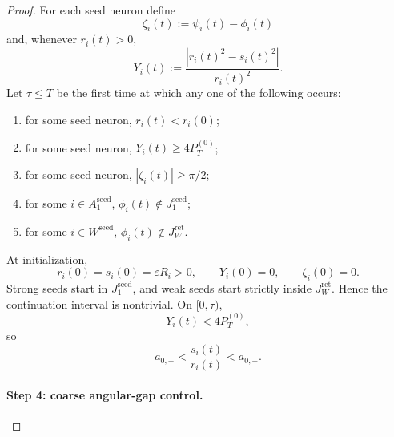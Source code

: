 \documentclass{article} %
\theoremstyle{plain}
\theoremstyle{definition}
\theoremstyle{remark}
\begin{document}
\begin{proof}
For each seed neuron define
\[
\zeta_i(t):=\psi_i(t)-\phi_i(t)
\]
and, whenever $r_i(t)>0$,
\[
Y_i(t)
:=
\frac{|r_i(t)^2-s_i(t)^2|}{r_i(t)^2}.
\]
Let $\tau\le T$ be the first time at which any one of the following occurs:
\begin{enumerate}[label=\textnormal{(\alph*)},leftmargin=2.6em]
\item for some seed neuron,
$r_i(t)<r_i(0)$;
\item for some seed neuron,
$Y_i(t)\ge4P_T^{(0)}$;
\item for some seed neuron,
$|\zeta_i(t)|\ge\pi/2$;
\item for some $i\in A_1^{\mathrm{seed}}$,
$\phi_i(t)\notin J_1^{\mathrm{seed}}$;
\item for some $i\in W^{\mathrm{seed}}$,
$\phi_i(t)\notin J_W^{\mathrm{ret}}$.
\end{enumerate}
At initialization,
\[
r_i(0)=s_i(0)=\varepsilon R_i>0,
\qquad
Y_i(0)=0,
\qquad
\zeta_i(0)=0.
\]
Strong seeds start in $J_1^{\mathrm{seed}}$, and weak seeds start strictly
inside $J_W^{\mathrm{ret}}$.  Hence the continuation interval is nontrivial.
On $[0,\tau)$,
\[
Y_i(t)<4P_T^{(0)},
\]
so
\[
\boxed{
a_{0,-}
<
\frac{s_i(t)}{r_i(t)}
<
a_{0,+}.
}
\]

\paragraph{Step 4: coarse angular-gap control.}


\end{proof}
\end{document}
